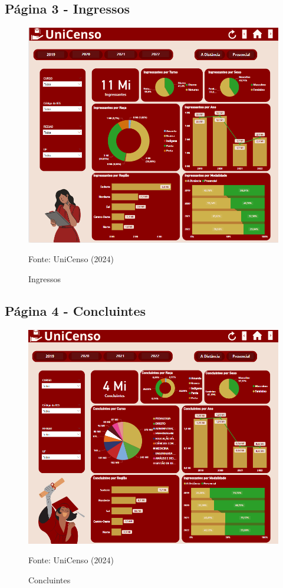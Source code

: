 \documentclass[a4paper,12pt]{article}
\begin{document}
\subsection{Página 3 - Ingressos}
\begin{figure}[H]
    \centering
    \includegraphics[width=\textwidth]{Imagem_3}
    \caption{Ingressos}
    \label{fig:concluintes_raca}
    \small Fonte: UniCenso (2024)
\end{figure}

\subsection{Página 4 - Concluintes}
\begin{figure}[H]
    \centering
    \includegraphics[width=\textwidth]{Imagem_4}
    \caption{Concluintes}
    \label{fig:ingressantes_concluintes_modalidade}
    \small Fonte: UniCenso (2024)
\end{figure}
\end{document}
